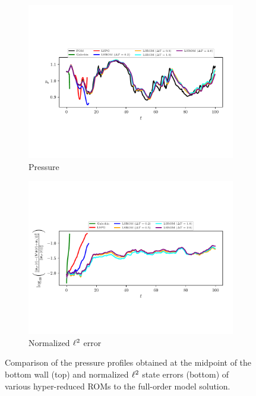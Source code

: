 \begin{figure}
\begin{center}

\begin{subfigure}[t]{0.95\textwidth}
\includegraphics[trim={0cm 3.0cm 0cm 3cm},clip,width=1.\linewidth]{figs/cavity/pressure_basis2.pdf}
\caption{Pressure} 
\label{fig:cav_results1a}
\end{subfigure}

\begin{subfigure}[t]{0.95\textwidth}
\includegraphics[trim={0cm 2.8cm 0cm 3cm},clip,width=1.\linewidth]{figs/cavity/error_basis2.pdf}
\caption{Normalized $\ell^2$ error}
\label{fig:cav_results1b}
\end{subfigure}

\end{center}
\caption{Comparison of the pressure profiles obtained at the midpoint of the bottom wall (top) and normalized $\ell^2$ state errors (bottom) of various hyper-reduced ROMs to the full-order model solution.}
\label{fig:cav_results1}
\end{figure}

